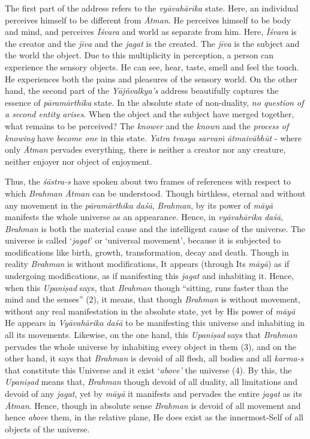 The first part of the address refers to the \emph{vyāvahārika} state. Here, an individual perceives himself to be different from \emph{Ātman}. He perceives himself to be body and mind, and perceives \emph{Īśvara} and world as separate from him. Here, \emph{Īśvara} is the creator and the \emph{jīva} and the \emph{jagat} is the created. The \emph{jīva} is the subject and the world the object. Due to this multiplicity in perception, a person can experience the sensory objects. He can see, hear, taste, smell and feel the touch. He experiences both the pains and pleasures of the sensory world. On the other hand, the second part of the \emph{Yājñvalkya's} address beautifully captures the essence of \emph{pāramārthika} state. In the absolute state of non-duality, \emph{no question of a second entity arises}. When the object and the subject have merged together, what remains to be perceived? The \emph{knower} and the \emph{known} and the \emph{process of knowing} have \emph{become one} in this state. \emph{Yatra tvasya} \emph{sarvaṁ} \emph{ātmaivābhūt} - where only \emph{Ātman} pervades everything, there is neither a creator nor any creature, neither enjoyer nor object of enjoyment.

Thus, the \emph{śāstra-s} have spoken about two frames of references with respect to which \emph{Brahman}  \emph{Ātman} can be understood. Though birthless, eternal and without any movement in the \emph{pāramārthika} \emph{daśā}, \emph{Brahman}, by its power of \emph{māyā} manifests the whole universe as an appearance. Hence, in \emph{vyāvahārika} \emph{daśā}, \emph{Brahman} is both the material cause and the intelligent cause of the universe. The universe is called `\emph{jagat}' or `universal movement', because it is subjected to modifications like birth, growth, transformation, decay and death. Though in reality \emph{Brahman} is without modifications, It appears (through Its \emph{māyā}) as if undergoing modifications, as if manifesting this \emph{jagat} and inhabiting it. Hence, when this \emph{Upaniṣad} says, that \emph{Brahman} though ``sitting, runs faster than the mind and the senses'' (2), it means, that though \emph{Brahman} is without movement, without any real manifestation in the absolute state, yet by His power of \emph{māyā} He appears in \emph{Vyāvahārika} \emph{daśā} to be manifesting this universe and inhabiting in all its movements. Likewise, on the one hand, this \emph{Upaniṣad} says that \emph{Brahman} pervades the whole universe by inhabiting every object in them (3), and on the other hand, it says that \emph{Brahman} is devoid of all flesh, all bodies and all \emph{karma-s} that constitute this Universe and it exist `\emph{above'} the universe (4). By this, the \emph{Upaniṣad} means that, \emph{Brahman} though devoid of all duality, all limitations and devoid of any \emph{jagat}, yet by \emph{māyā} it manifests and pervades the entire \emph{jagat} as its \emph{Ātman}. Hence, though in absolute sense \emph{Brahman} is devoid of all movement and hence \emph{above} them, in the relative plane, He does exist as the innermost-Self of all objects of the universe.


